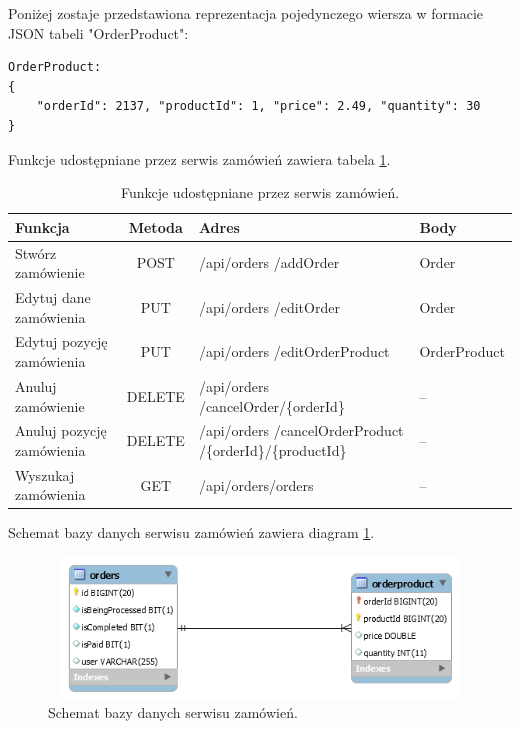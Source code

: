 \documentclass[11pt,a4paper,twoside]{article}
\begin{document}
Poniżej zostaje przedstawiona reprezentacja pojedynczego wiersza w formacie JSON tabeli "OrderProduct":
\vspace{+30pt}

\begin{lstlisting}
OrderProduct:
{
	"orderId": 2137, "productId": 1, "price": 2.49, "quantity": 30 
}
\end{lstlisting}
\vspace{-20pt}

Funkcje udostępniane przez serwis zamówień zawiera tabela \ref{funkcjeOrderWebservice}.
\begin{table}[htp]
\caption{Funkcje udostępniane przez serwis zamówień.}
\label{funkcjeOrderWebservice}
\centering
\begin{tabularx}{\textwidth}{|X|c|X|X|}
\hline
 Funkcja & Metoda & Adres & Body \\\hline
 Stwórz zamówienie & POST & /api/orders /addOrder & Order \\\hline
 Edytuj dane zamówienia & PUT & /api/orders /editOrder & Order \\\hline
 Edytuj pozycję zamówienia & PUT & /api/orders /editOrderProduct & OrderProduct \\\hline
 Anuluj zamówienie & DELETE & /api/orders /cancelOrder/\{orderId\} & -- \\\hline
 Anuluj pozycję zamówienia & DELETE & /api/orders /cancelOrderProduct /\{orderId\}/\{productId\} & -- \\\hline
 Wyszukaj zamówienia & GET & /api/orders/orders & -- \\\hline
\end{tabularx}
\end{table}

Schemat bazy danych serwisu zamówień zawiera diagram \ref{ordertDB}.

\begin{figure}[ht]
\caption{Schemat bazy danych serwisu zamówień.}
\label{ordertDB}
\centering
\includegraphics[height=3.75cm, width=11.7cm]{orderDB}
\end{figure}
\end{document}
